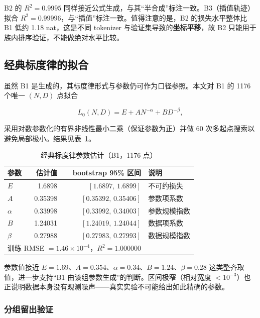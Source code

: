 B2 的 $R^2=0.9995$ 同样接近公式生成，与其``半合成''标注一致。B3（插值轨迹）拟合 $R^2=0.99996$，与``插值''标注一致。值得注意的是，B2 的损失水平整体比 B1 低约 1.18 nat，这是不同 tokenizer 与验证集导致的\textbf{坐标平移}，故 B2 只能用于族内排序验证，不能做绝对水平比较。

\subsection{经典标度律的拟合}
\label{sec:q2_classic}

虽然 B1 是生成的，其标度律形式与参数仍可作为口径参照。本文对 B1 的 1176 个唯一 $(N,D)$ 点拟合

\begin{equation}
L_0(N,D)=E+AN^{-\alpha}+BD^{-\beta},
\end{equation}

采用对数参数化的有界非线性最小二乘（保证参数为正）并做 60 次多起点搜索以避免局部极小。结果见表~\ref{tab:q2_classic}。

\begin{table}[htbp]
\centering
\caption{经典标度律参数估计（B1，1176 点）}
\label{tab:q2_classic}
\small
\begin{tabular}{l|r|r|l}
\toprule
\textbf{参数} & \textbf{估计值} & \textbf{bootstrap 95\% 区间} & \textbf{说明} \\
\midrule
$E$ & 1.6898 & $[1.6897,\,1.6899]$ & 不可约损失 \\
$A$ & 0.35398 & $[0.35392,\,0.35406]$ & 参数项系数 \\
$\alpha$ & 0.33998 & $[0.33992,\,0.34003]$ & 参数规模指数 \\
$B$ & 1.24031 & $[1.24019,\,1.24044]$ & 数据项系数 \\
$\beta$ & 0.27988 & $[0.27983,\,0.27993]$ & 数据规模指数 \\
\midrule
\multicolumn{3}{l}{训练 RMSE $=1.46\times10^{-4}$，$R^2=1.000000$} & \\
\bottomrule
\end{tabular}
\end{table}

参数值接近 $E=1.69$、$A=0.354$、$\alpha=0.34$、$B=1.24$、$\beta=0.28$ 这类整齐取值，进一步支持``B1 由该组参数生成''的判断。区间极窄（相对宽度 $<10^{-3}$）也正说明数据本身没有观测噪声——真实实验不可能给出如此精确的参数。

\subsubsection{分组留出验证}

